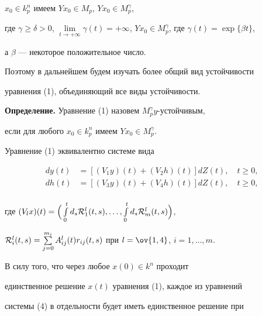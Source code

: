$x_0 \in k_p^n$ имеем $Yx_0 \in M_p$, $Yx_0 \in M_p^\gamma $, 


где $\gamma \ge \delta > 0$, $\lim \limits_{t\to +\infty }\gamma (t) = 


+\infty $, $Yx_0 \in M_p^\gamma $, где $\gamma (t) = \exp \{\beta t\}$, 


а $\beta $ --- некоторое положительное число.


Поэтому в дальнейшем будем изучать более общий вид устойчивости 


уравнения (1), объединяющий все виды устойчивости. 


\medskip





{\bf Определение.} Уравнение (1) назовем $M_p^\gamma y$-устойчивым, 


если для любого $x_0 \in k_p^n$ имеем $Yx_0 \in M_p^\gamma$.


\medskip





Уравнение (1) эквивалентно системе вида


\begin{equation}


\begin{split}


dy(t) &= [(V_1y)(t) + (V_2h)(t)]dZ(t),\quad t \ge 0, \\


dh(t) &= [(V_3y)(t) + (V_4h)(t)]dZ(t),\quad t \ge 0, \\


\end{split}


\end{equation}


где $(V_lx)(t) = \Big(\int \limits_0^td_s{\cal R}_1^l(t,s),\dotsc, 


\int \limits_0^td_s{\cal R}_m^l(t,s)\Big)$, 


${\cal R}_i^l(t,s) = \sum \limits_{j=0}^{m_i}


A_{ij}^l(t)r_{ij}(t,s)$ при $l = \ov{1,4}$, $i = 1,\dotsc, m$. 





В силу того, что через любое $x(0) \in k^n$ проходит 


единственное решение $x(t)$ уравнения (1), каждое из уравнений 


системы (4) в отдельности будет иметь единственное решение при 


